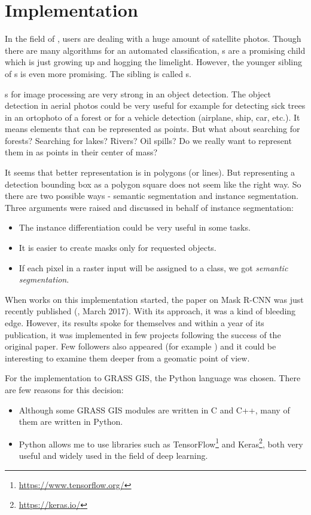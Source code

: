 \chapter{Implementation}
\label{implementation}

In the field of , users are dealing with a huge amount of satellite photos. Though 
there are many algorithms for an automated classification, s are a 
promising child which is just growing up and hogging the limelight. However, the 
younger sibling of s is even more promising. The sibling is called 
s.

s for image processing are very strong in an object detection. The 
object detection in aerial photos could be very useful for example for detecting 
sick trees in an ortophoto of a forest or for a vehicle detection (airplane, 
ship, car, etc.). It means elements that can be represented as points. But what 
about searching for forests? Searching for lakes? Rivers? Oil spills? Do we 
really want to represent them in  as points in their center of mass?

It seems that better representation is in polygons (or lines). But representing 
a detection bounding box as a polygon square does not seem like the right way. 
So there are two possible ways - semantic segmentation and instance 
segmentation. Three arguments were raised and discussed in behalf of instance 
segmentation:
\begin{itemize}
	\item The instance differentiation could be very useful in some tasks.
	\item It is easier to create masks only for requested objects.
	\item If each pixel in a raster input will be assigned to a class, we got \textit{semantic segmentation}.
\end{itemize}

When works on this implementation started, the paper on Mask R-CNN was just 
recently published (\cite{mask-rcnn}, March 2017). With its approach, it was a 
kind of bleeding edge. However, its results spoke for themselves and within a 
year of its publication, it was implemented in few projects following the 
success of the original paper. Few followers also appeared (for example 
\cite{masklab}) and it could be interesting to examine them deeper from a 
geomatic point of view.

For the implementation to GRASS GIS, the Python language was chosen. There are 
few reasons for this decision:
\begin{itemize}
	\item Although some GRASS GIS modules are written in C and C++, many of them are written in Python.
	\item Python allows me to use libraries such as TensorFlow\footnote{\url{https://www.tensorflow.org/}} and Keras\footnote{\url{https://keras.io/}}, both very useful and widely used in the field of deep learning. 
\end{itemize}

